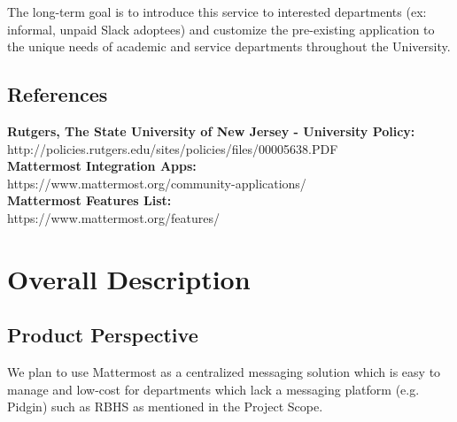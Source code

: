 \documentclass{scrreprt}
\begin{document}
The long-term goal is to introduce this service to interested departments (ex: informal, unpaid Slack adoptees) and
customize the pre-existing application to the unique needs of academic and service departments throughout the University.

\section{References}

\textbf{Rutgers, The State University of New Jersey - University Policy:}\\
http://policies.rutgers.edu/sites/policies/files/00005638.PDF\\

\noindent
\textbf{Mattermost Integration Apps:}\\
https://www.mattermost.org/community-applications/\\

\noindent
\textbf{Mattermost Features List:}\\
https://www.mattermost.org/features/\\


\chapter{Overall Description}

\section{Product Perspective}


We plan to use Mattermost as a centralized messaging solution which is easy to
manage and low-cost for departments which lack a messaging platform (e.g.
Pidgin) such as RBHS as mentioned in the Project Scope.
\end{document}
